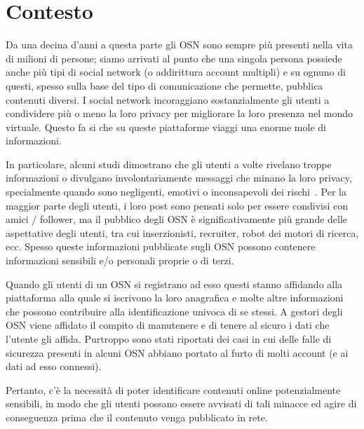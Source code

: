 \section{Contesto}
Da una decina d'anni a questa parte gli OSN sono sempre più presenti nella vita di milioni di persone; siamo arrivati al punto che una singola persona possiede anche più tipi di social network (o addirittura account multipli) e su ognuno di questi, spesso sulla base del tipo di comunicazione che permette, pubblica contenuti diversi. I social network incoraggiano sostanzialmente gli utenti a condividere più o meno la loro privacy per migliorare la loro presenza nel mondo virtuale. Questo fa si che su queste piattaforme viaggi una enorme mole di informazioni.

In particolare, alcuni studi dimostrano che gli utenti a volte rivelano troppe informazioni o divulgano involontariamente messaggi che minano la loro privacy, specialmente quando sono negligenti, emotivi o inconsapevoli dei rischi~\cite{looseTweets, studyFb, readMyTwitter}.
Per la maggior parte degli utenti, i loro post sono pensati solo per essere condivisi con amici / follower, ma il pubblico degli OSN è significativamente più grande delle aspettative degli utenti, tra cui inserzionisti, recruiter, robot dei motori di ricerca, ecc.
Spesso queste informazioni pubblicate sugli OSN possono contenere informazioni sensibili e/o personali proprie o di terzi. 

Quando gli utenti di un OSN si registrano ad esso questi stanno affidando alla piattaforma alla quale si iscrivono la loro anagrafica e molte altre informazioni che possono contribuire alla identificazione univoca di se stessi. A gestori degli OSN viene affidato il compito di manutenere e di tenere al sicuro i dati che l'utente gli affida. Purtroppo sono stati riportati dei casi in cui delle falle di sicurezza presenti in alcuni OSN abbiano portato al furto di molti account (e ai dati ad esso connessi).

Pertanto, c'è la necessità di poter identificare contenuti online potenzialmente sensibili, in modo che gli utenti possano essere avvisati di tali minacce ed agire di conseguenza prima che il contenuto venga pubblicato in rete.




